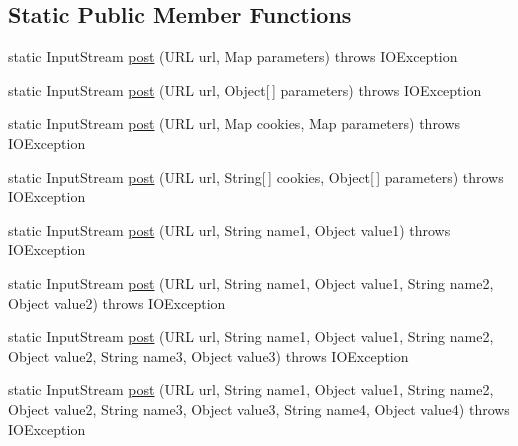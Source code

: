 \subsection*{Static Public Member Functions}
\begin{DoxyCompactItemize}
\item 
static InputStream \hyperlink{classj_bittorrent_a_p_i_1_1_client_http_request_a21230c47f8549b6a6030ad5a0c8ce65b}{post} (URL url, Map parameters)  throws IOException 
\item 
static InputStream \hyperlink{classj_bittorrent_a_p_i_1_1_client_http_request_a7e1e5a95d7e6ae3c4427a95cde28fd91}{post} (URL url, Object\mbox{[}$\,$\mbox{]} parameters)  throws IOException 
\item 
static InputStream \hyperlink{classj_bittorrent_a_p_i_1_1_client_http_request_acbfe05d2f3688997776974f5684ee61b}{post} (URL url, Map cookies, Map parameters)  throws IOException 
\item 
static InputStream \hyperlink{classj_bittorrent_a_p_i_1_1_client_http_request_ac123f48f50dfb4b13d3007045943dd7d}{post} (URL url, String\mbox{[}$\,$\mbox{]} cookies, Object\mbox{[}$\,$\mbox{]} parameters)  throws IOException 
\item 
static InputStream \hyperlink{classj_bittorrent_a_p_i_1_1_client_http_request_ab5c84f7a22e0839f9bae89bb8d0a804b}{post} (URL url, String name1, Object value1)  throws IOException 
\item 
static InputStream \hyperlink{classj_bittorrent_a_p_i_1_1_client_http_request_a97d632b5157b69dd2ff00f171b89dab5}{post} (URL url, String name1, Object value1, String name2, Object value2)  throws IOException 
\item 
static InputStream \hyperlink{classj_bittorrent_a_p_i_1_1_client_http_request_ab63b1b9ef7fe878481a981c5f6e3b671}{post} (URL url, String name1, Object value1, String name2, Object value2, String name3, Object value3)  throws IOException 
\item 
static InputStream \hyperlink{classj_bittorrent_a_p_i_1_1_client_http_request_a8954c914c904a99b844c8c6db0f08206}{post} (URL url, String name1, Object value1, String name2, Object value2, String name3, Object value3, String name4, Object value4)  throws IOException 
\end{DoxyCompactItemize}
